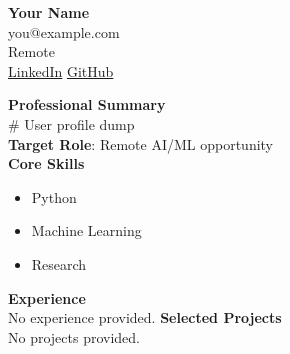 \documentclass[11pt]{article}
\begin{document}
\begin{center}
{\Large \textbf{Your Name}}\\
you@example.com \\
Remote\\
\href{https://www.linkedin.com}{LinkedIn} \quad \href{https://github.com}{GitHub}
\end{center}
\vspace{0.2cm}
\noindent\textbf{Professional Summary}\\
\# User profile dump\\
\vspace{0.2cm}
\noindent\textbf{Target Role}: Remote AI/ML opportunity\\
\vspace{0.2cm}
\noindent\textbf{Core Skills}\\
\begin{itemize}[leftmargin=*]
\item {Python}
\item {Machine Learning}
\item {Research}
\end{itemize}
\vspace{0.2cm}
\noindent\textbf{Experience}\\
No experience provided.
\vspace{0.2cm}
\noindent\textbf{Selected Projects}\\
No projects provided.
\end{document}
